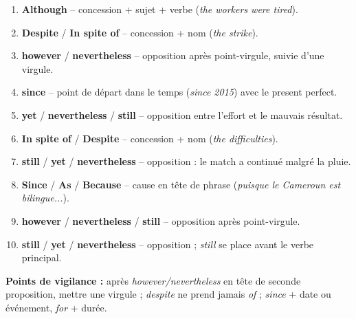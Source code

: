 \documentclass[11pt]{article}
\newcounter{popsec}
\newcounter{popsub}
\newcommand{\courssub}[1]{%
  \stepcounter{popsub}%
  \par\vspace{9pt}\noindent{\popxbold\fontsize{11.5}{13}\selectfont\color{popink}{\color{poporange}\thepopsec.\thepopsub}\hspace{6pt}#1}\par\nopagebreak\vspace{4pt}
}
\begin{document}
\courssub{Je m'entraîne}

\begin{corrige}
\begin{enumerate}
\item \textbf{Although} -- concession + sujet + verbe (\emph{the workers were tired}).
\item \textbf{Despite} / \textbf{In spite of} -- concession + nom (\emph{the strike}).
\item \textbf{however} / \textbf{nevertheless} -- opposition après point-virgule, suivie d'une virgule.
\item \textbf{since} -- point de départ dans le temps (\emph{since 2015}) avec le present perfect.
\item \textbf{yet} / \textbf{nevertheless} / \textbf{still} -- opposition entre l'effort et le mauvais résultat.
\item \textbf{In spite of} / \textbf{Despite} -- concession + nom (\emph{the difficulties}).
\item \textbf{still} / \textbf{yet} / \textbf{nevertheless} -- opposition : le match a continué malgré la pluie.
\item \textbf{Since} / \textbf{As} / \textbf{Because} -- cause en tête de phrase (\emph{puisque le Cameroun est bilingue...}).
\item \textbf{however} / \textbf{nevertheless} / \textbf{still} -- opposition après point-virgule.
\item \textbf{still} / \textbf{yet} / \textbf{nevertheless} -- opposition ; \emph{still} se place avant le verbe principal.
\end{enumerate}
\textbf{Points de vigilance :} après \emph{however/nevertheless} en tête de seconde proposition, mettre une virgule ; \emph{despite} ne prend jamais \emph{of} ; \emph{since} + date ou événement, \emph{for} + durée.
\end{corrige}
\end{document}
